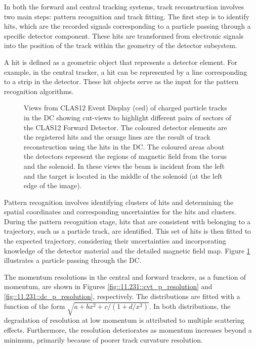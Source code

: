     In both the forward and central tracking systems, track reconstruction involves two main steps: pattern recognition and track fitting.
    The first step is to identify hits, which are the recorded signals corresponding to a particle passing through a specific detector component.
    These hits are transformed from electronic signals into the position of the track within the geometry of the detector subsystem.

    A hit is defined as a geometric object that represents a detector element.
    For example, in the central tracker, a hit can be represented by a line corresponding to a strip in the detector.
    These hit objects serve as the input for the pattern recognition algorithms.

    \begin{figure}[t]
        \caption[Particle going through DC.]
        {Views from CLAS12 Event Display (ced) of charged particle tracks in the DC showing cut-views to highlight different pairs of sectors of the CLAS12 Forward Detector.
        The coloured detector elements are the registered hits and the orange lines are the result of track reconstruction using the hits in the DC.
        The coloured areas about the detectors represent the regions of magnetic field from the torus and the solenoid.
        In these views the beam is incident from the left and the target is located in the middle of the solenoid (at the left edge of the image).}
        \label{fig::ced_event}
    \end{figure}
    Pattern recognition involves identifying clusters of hits and determining the spatial coordinates and corresponding uncertainties for the hits and clusters.
    During the pattern recognition stage, hits that are consistent with belonging to a trajectory, such as a particle track, are identified.
    This set of hits is then fitted to the expected trajectory, considering their uncertainties and incorporating knowledge of the detector material and the detailed magnetic field map.
    Figure \ref{fig::ced_event} illustrates a particle passing through the DC.

    The momentum resolutions in the central and forward trackers, as a function of momentum, are shown in Figures \ref{fig::11.231::cvt_p_resolution} and \ref{fig::11.231::dc_p_resolution}, respectively.
    The distributions are fitted with a function of the form $\sqrt{a + bx^2 + c/(1 + d/x^2)}$.
    In both distributions, the degradation of resolution at low momentum is attributed to multiple scattering effects.
    Furthermore, the resolution deteriorates as momentum increases beyond a minimum, primarily because of poorer track curvature resolution.

